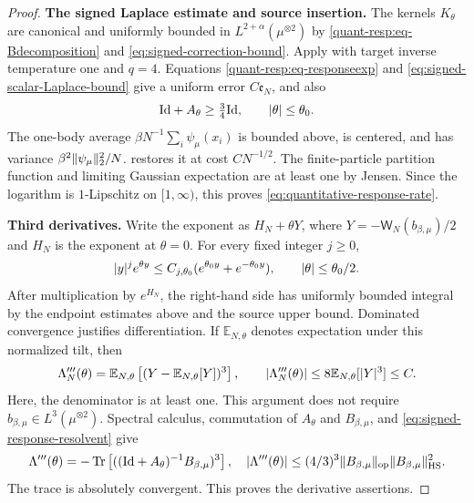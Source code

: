 \documentclass[11pt,reqno]{amsart}
\numberwithin{equation}{section}
\theoremstyle{plain}
\theoremstyle{remark}
\DeclarePairedDelimiter{\abs}{\lvert}{\rvert}
\DeclarePairedDelimiter{\norm}{\lVert}{\rVert}
\newcommand{\E}{{\mathbb{E}}}
\newcommand{\be}{\beta}
\DeclareMathOperator{\Tr}{Tr}
\newcommand{\step}[1]{\par\medskip\noindent\textbf{#1}}
\begin{document}
\begin{proof}
\step{The signed Laplace estimate and source insertion.}
The kernels $K_\theta$ are canonical and uniformly bounded in
$L^{2+\alpha}(\mu^{\otimes2})$ by
\eqref{quant-resp:eq-Bdecomposition} and
\eqref{eq:signed-correction-bound}.  Apply
 with target inverse temperature one
and $q=4$.  Equations \eqref{quant-resp:eq-responseexp} and
\eqref{eq:signed-scalar-Laplace-bound} give a uniform error
$C\mathfrak e_N$, and also
\begin{equation}\label{eq:signed-response-resolvent}
 \mathrm{Id}+A_\theta\geq\tfrac34\mathrm{Id},
 \qquad\abs\theta\leq\theta_0.
\end{equation}
The one-body average $\be N^{-1}\sum_i\psi_\mu(x_i)$ is bounded above,
is centered, and has variance $\be^2\norm{\psi_\mu}_2^2/N$.
 restores it at cost $CN^{-1/2}$.
The finite-particle partition function and limiting Gaussian expectation
are at least one by Jensen.  Since the logarithm is $1$-Lipschitz on
$[1,\infty)$, this proves \eqref{eq:quantitative-response-rate}.

\step{Third derivatives.}
Write the exponent as $H_N+\theta Y$, where
$Y=-\mathsf W_N(b_{\be,\mu})/2$ and $H_N$ is the exponent at $\theta=0$.
For every fixed integer $j\geq0$,
\begin{equation}\label{eq:signed-response-derivative-domination}
 \abs y^j e^{\theta y}
 \leq C_{j,\theta_0}(e^{\theta_0y}+e^{-\theta_0y}),
 \qquad \abs\theta\leq\theta_0/2.
\end{equation}
After multiplication by $e^{H_N}$, the right-hand side has uniformly
bounded integral by the endpoint estimates above and the source upper
bound.  Dominated convergence justifies differentiation.  If
$\E_{N,\theta}$ denotes expectation under this normalized tilt, then
\begin{equation}\label{eq:signed-response-third-derivative}
 \Lambda_N'''(\theta)
 =\E_{N,\theta}\left[(Y-\E_{N,\theta}[Y])^3\right],
 \qquad\abs{\Lambda_N'''(\theta)}\leq8\E_{N,\theta}[\abs Y^3]\leq C.
\end{equation}
Here, the denominator is at least one.  This argument does not require
$b_{\be,\mu}\in L^3(\mu^{\otimes2})$.  Spectral calculus, commutation of
$A_\theta$ and $B_{\be,\mu}$, and
\eqref{eq:signed-response-resolvent} give
\begin{equation}\label{eq:signed-limit-third-derivative}
 \Lambda'''(\theta)
 =-\Tr\left[((\mathrm{Id}+A_\theta)^{-1}B_{\be,\mu})^3\right],
 \quad
 \abs{\Lambda'''(\theta)}
 \leq(4/3)^3\norm{B_{\be,\mu}}_{\mathrm{op}}
                \norm{B_{\be,\mu}}_{\mathrm{HS}}^2.
\end{equation}
The trace is absolutely convergent.  This proves the derivative assertions.
\end{proof}
\end{document}
